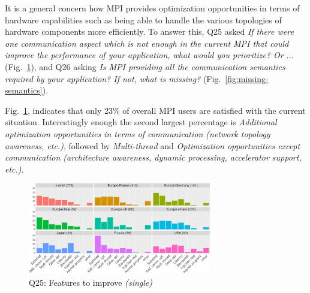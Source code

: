\documentclass[preprint,5p,times]{elsarticle}
\def\myquote#1{{\it #1}}
\begin{document}
It is a general concern how MPI provides optimization
opportunities in terms of hardware capabilities such as being able to
handle the various topologies of hardware components more
efficiently. To answer this, Q25 asked \myquote{If there were one
communication aspect which is not enough in the current MPI that could
improve the performance of your application, what would you
prioritize? Or $\ldots$} (Fig.~\ref{fig:missing-features}), and Q26 asking
\myquote{Is MPI providing all the communication semantics required by your
application? If not, what is missing?}
(Fig.~\ref{fig:missing-semantics}).

Fig.~\ref{fig:missing-features}, indicates that only 23\% of overall MPI users
are satisfied with the current situation. Interestingly enough the second
largest percentage is \myquote{Additional optimization opportunities in terms of
communication (network topology awareness, etc.)}, followed by
\myquote{Multi-thread} and \myquote{Optimization opportunities except
communication (architecture awareness, dynamic processing, accelerator support,
etc.)}.

\begin{figure}[htb]
\begin{center}
\includegraphics[width=8.0cm]{R-scripts/Q25.pdf}
\vspace{-2mm}
\caption{Q25: Features to improve {\it(single)}}
\label{fig:missing-features}
\end{center}
\end{figure}
\end{document}
